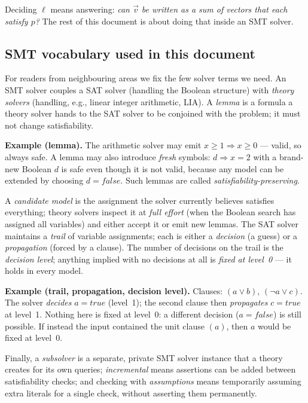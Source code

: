 \documentclass[11pt]{article}
\newcommand{\vv}{\ensuremath{\vec{v}}\xspace}
\newcommand{\true}{\ensuremath{\mathit{true}}\xspace}
\newcommand{\false}{\ensuremath{\mathit{false}}\xspace}
\begin{document}
Deciding $\ell$ means answering: \emph{can $\vv$ be written as a sum of
vectors that each satisfy $p$?} The rest of this document is about doing
that inside an SMT solver.

\subsection{SMT vocabulary used in this document}

For readers from neighbouring areas we fix the few solver terms we need.
An SMT solver couples a SAT solver (handling the Boolean structure) with
\emph{theory solvers} (handling, e.g., linear integer arithmetic, LIA). A
\emph{lemma} is a formula a theory solver hands to the SAT solver to be
conjoined with the problem; it must not change satisfiability.

\begin{exbox}
\textbf{Example (lemma).} The arithmetic solver may emit
$x \ge 1 \Rightarrow x \ge 0$ --- valid, so always safe. A lemma may also
introduce \emph{fresh} symbols: $d \Rightarrow x = 2$ with a brand-new
Boolean $d$ is safe even though it is not valid, because any model can be
extended by choosing $d = \false$. Such lemmas are called
\emph{satisfiability-preserving}.
\end{exbox}

A \emph{candidate model} is the assignment the solver currently believes
satisfies everything; theory solvers inspect it at \emph{full effort} (when
the Boolean search has assigned all variables) and either accept it or emit
new lemmas. The SAT solver maintains a \emph{trail} of variable
assignments; each is either a \emph{decision} (a guess) or a
\emph{propagation} (forced by a clause). The number of decisions on the
trail is the \emph{decision level}; anything implied with no decisions at
all is \emph{fixed at level~0} --- it holds in every model.

\begin{exbox}
\textbf{Example (trail, propagation, decision level).} Clauses:
$(a \vee b)$, $(\neg a \vee c)$. The solver \emph{decides} $a = \true$
(level~1); the second clause then \emph{propagates} $c = \true$ at
level~1. Nothing here is fixed at level~0: a different decision
($a=\false$) is still possible. If instead the input contained the unit
clause $(a)$, then $a$ would be fixed at level~0.
\end{exbox}

Finally, a \emph{subsolver} is a separate, private SMT solver instance that
a theory creates for its own queries; \emph{incremental} means assertions
can be added between satisfiability checks; and checking with
\emph{assumptions} means temporarily assuming extra literals for a single
check, without asserting them permanently.
\end{document}
